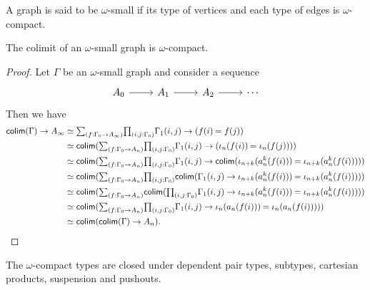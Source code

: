 \begin{defn}
A graph is said to be $\omega$-small if its type of vertices and each type of
edges is $\omega$-compact. 
\end{defn}

\begin{thm}
The colimit of an $\omega$-small graph is $\omega$-compact. 
\end{thm}

\begin{proof}
Let $\Gamma$ be an $\omega$-small graph and consider a sequence
\begin{equation*}
\begin{tikzcd}
A_0 \arrow[r] & A_1 \arrow[r] & A_2 \arrow[r] & \cdots
\end{tikzcd}
\end{equation*}
Then we have
\begin{align*}
\tfcolim(\Gamma)\to A_\infty
& \eqvsym \sm{f:\pts{\Gamma}\to A_\infty}\prd{i,j:\pts{\Gamma}}\edg{\Gamma}(i,j)\to(\id{f(i)}{f(j)}) \\
& \eqvsym \tfcolim(\sm{f:\pts{\Gamma}\to A_n}\prd{i,j:\pts{\Gamma}}\edg{\Gamma}(i,j)\to(\id{\iota_n(f(i))}{\iota_n(f(j))})) \\
& \eqvsym \tfcolim(\sm{f:\pts{\Gamma}\to A_n}\prd{i,j:\pts{\Gamma}}\edg{\Gamma}(i,j)\to\tfcolim(\id{\iota_{n+k}(a^k_n(f(i)))}{\iota_{n+k}(a^k_n(f(i)))}))\\
& \eqvsym \tfcolim(\sm{f:\pts{\Gamma}\to A_n}\prd{i,j:\pts{\Gamma}} \tfcolim(\edg{\Gamma}(i,j)\to\id{\iota_{n+k}(a^k_n(f(i)))}{\iota_{n+k}(a^k_n(f(i)))}))\\
& \eqvsym \tfcolim(\sm{f:\pts{\Gamma}\to A_n}\tfcolim(\prd{i,j:\pts{\Gamma}} \edg{\Gamma}(i,j)\to\id{\iota_{n+k}(a^k_n(f(i)))}{\iota_{n+k}(a^k_n(f(i)))}))\\
& \eqvsym \tfcolim(\sm{f:\pts{\Gamma}\to A_n}\prd{i,j:\pts{\Gamma}} \edg{\Gamma}(i,j)\to\id{\iota_{n}(a_n(f(i)))}{\iota_{n}(a_n(f(i)))})) \\
& \eqvsym \tfcolim(\tfcolim(\Gamma)\to A_n).\qedhere
\end{align*}
\end{proof}

\begin{cor}
The $\omega$-compact types are closed under dependent pair types, subtypes,
cartesian products, suspension and pushouts.
\end{cor}

